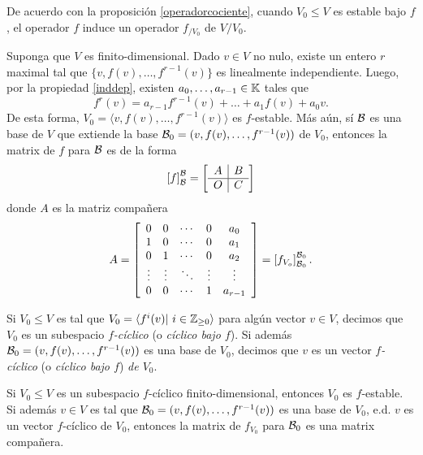 \begin{obs}
  De acuerdo con la proposición \ref{operadorcociente}, cuando $V_0\le V$ es estable bajo $f$, el operador $f$ induce un operador $f_{/V_0}$ de $V/V_0$.
\end{obs}

\begin{obs}\label{festablecompa}
  Suponga que $V$ es finito-dimensional. Dado $v\in V$ no nulo, existe un entero $r$ maximal tal que $\{v,f(v),\ldots,f^{r-1}(v)\}$ es linealmente independiente. Luego, por la propiedad \ref{inddep}, existen $a_0,\ldots,a_{r-1}\in\mathbb{K}$ tales que
  $$f^r(v)=a_{r-1}f^{r-1}(v)+\ldots+a_{1}f(v)+a_0v.$$
De esta forma, $V_0=\langle v,f(v),\ldots,f^{r-1}(v)\rangle$ es $f$-estable. Más aún, sí $\mathcal{B}$ es una base de $V$ que extiende la base $\mathcal{B}_0=(v,f(v),\ldots,f^{r-1}(v))$ de $V_0$, entonces la matrix de $f$ para $\mathcal{B}$ es de la forma
  $$
    \left[f\right]_{\mathcal{B}}^{\mathcal{B}}=\left[\begin{array}{c|c}
      A & B\\
      \hline
      O & C
    \end{array}\right]
  $$
donde $A$ es la matriz compañera
  $$
  A=\left[\begin{array}{ccccc}
    0 & 0 & \cdots & 0 & a_0\\
    1 & 0 & \cdots & 0 & a_1\\
    0 & 1 & \cdots & 0 & a_2\\
    \vdots & \vdots & \ddots & \vdots & \vdots\\
    0 & 0 & \cdots & 1 & a_{r-1}
  \end{array}\right]=\left[f_{V_o}\right]_{\mathcal{B}_0}^{\mathcal{B}_0}.
  $$
\end{obs}

\begin{defn}
  Si $V_0\le V$ es tal que $V_0=\langle f^i(v)|\ i\in\mathbb{Z}_{\ge 0} \rangle$ para algún vector $v\in V$, decimos que $V_0$ es un subespacio \emph{$f$-cíclico} (o \emph{cíclico bajo $f$}). Si además $\mathcal{B}_0=(v,f(v),\ldots,f^{r-1}(v))$ es una base de $V_0$, decimos que $v$ es un vector \emph{$f$-cíclico} (o \emph{cíclico bajo $f$}) \emph{de $V_0$}.
\end{defn}

\begin{obs}
  Si $V_0\le V$ es un subespacio $f$-cíclico finito-dimensional, entonces $V_0$ es $f$-estable. Si además $v\in V$ es tal que $\mathcal{B}_0=(v,f(v),\ldots,f^{r-1}(v))$ es una base de $V_0$, e.d. $v$ es un vector $f$-cíclico de $V_0$, entonces la matrix de $f_{V_0}$ para $\mathcal{B}_0$ es una matrix compañera.
\end{obs}

